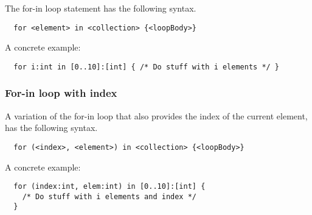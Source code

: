 The for-in loop statement has the following syntax.

\begin{verbatim}
  for <element> in <collection> {<loopBody>}
\end{verbatim}

A concrete example:

\begin{verbatim}
  for i:int in [0..10]:[int] { /* Do stuff with i elements */ }
\end{verbatim}

\subsubsection{For-in loop with index}
\label{sec:forInLoopIndex}

A variation of the for-in loop that also provides the index of the current element, has the following syntax.

\begin{verbatim}
  for (<index>, <element>) in <collection> {<loopBody>}
\end{verbatim}

A concrete example:

\begin{verbatim}
  for (index:int, elem:int) in [0..10]:[int] { 
    /* Do stuff with i elements and index */ 
  }
\end{verbatim}